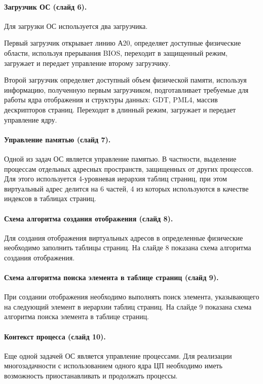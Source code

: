 \documentclass[12pt]{article}
\begin{document}
\paragraph{Загрузчик ОС (слайд 6).}
Для загрузки ОС используется два загрузчика.

Первый загрузчик открывает линию А20, определяет доступные физические области, используя
прерывания BIOS, переходит в защищенный режим, загружает и передает управление второму
загрузчику.

Второй загрузчик определяет доступный объем физической памяти, используя информацию, полученную
первым загрузчиком, подготавливает требуемые для работы ядра отображения и структуры данных:
GDT, PML4, массив дескрипторов страниц. Переходит в длинный режим, загружает и передает
управление ядру.


\paragraph{Управление памятью (слайд 7).}
Одной из задач ОС является управление памятью. В частности, выделение процессам отдельных
адресных пространств, защищенных от других процессов. Для этого используется 4-уровневая
иерархия таблиц страниц, при этом виртуальный адрес делится на 6 частей, 4 из которых
используются в качестве индексов в таблицах страниц.

\paragraph{Схема алгоритма создания отображения (слайд 8).}
Для создания отображения виртуальных адресов в определенные физические необходимо заполнить
таблицы страниц. На слайде 8 показана схема алгоритма создания отображения.

\paragraph{Схема алгоритма поиска элемента в таблице страниц (слайд 9).}
При создании отображения необходимо выполнять поиск элемента, указывающего на следующий элемент
в иерархии таблиц страниц. На слайде 9 показана схема алгоритма поиска элемента в таблице страниц.


\paragraph{Контекст процесса (слайд 10).}
Еще одной задачей ОС является управление процессами. Для реализации многозадачности с
использованием одного ядра ЦП необходимо иметь возможность приостанавливать и продолжать процессы.
\end{document}
